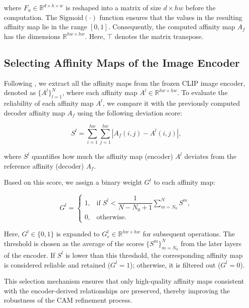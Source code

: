 where $F_u \in \mathbb{R}^{d \times h \times w}$ is reshaped into a matrix of size $d \times hw$ before the computation. The $\text{Sigmoid}(\cdot)$ function ensures that the values in the resulting affinity map lie in the range $[0, 1]$. Consequently, the computed affinity map $A_f$ has the dimensions $\mathbb{R}^{hw \times hw}$. Here, $\top$ denotes the matrix transpose.

\subsection{Selecting Affinity Maps of the Image Encoder}
\label{subsec:att_map_encoder}
Following \cite{wsss_frozen_clip}, we extract all the affinity maps from the frozen CLIP image encoder, denoted as $\{A^l\}_{l=1}^N$, where each affinity map $A^l \in \mathbb{R}^{hw \times hw}$. To evaluate the reliability of each affinity map $A^l$, we compare it with the previously computed decoder affinity map $A_f$ using the following deviation score:

\begin{equation}
    S^l = \sum_{i=1}^{hw} \sum_{j=1}^{hw} \left| A_f(i, j) - A^l(i, j) \right|,
\end{equation}

where $S^l$ quantifies how much the affinity map (encoder) $A^l$ deviates from the reference affinity (decoder) $A_f$.  

Based on this score, we assign a binary weight $G^l$ to each affinity map:  

\begin{equation}
    G^l =
    \begin{cases}
        1, & \text{if } S^l < \dfrac{1}{N - N_0 + 1} \sum_{m=N_0}^N S^m, \\[8pt]
        0, & \text{otherwise}.
    \end{cases}
\end{equation}

Here, $G^l \in \{0,1\}$ is expanded to $G^l_e \in \mathbb{R}^{hw \times hw}$ for subsequent operations. The threshold is chosen as the average of the scores $\{S^m\}_{m=N_0}^N$ from the later layers of the encoder. If $S^l$ is lower than this threshold, the corresponding affinity map is considered reliable and retained ($G^l = 1$); otherwise, it is filtered out ($G^l = 0$).  

This selection mechanism ensures that only high-quality affinity maps consistent with the encoder-derived relationships are preserved, thereby improving the robustness of the CAM refinement process.  

